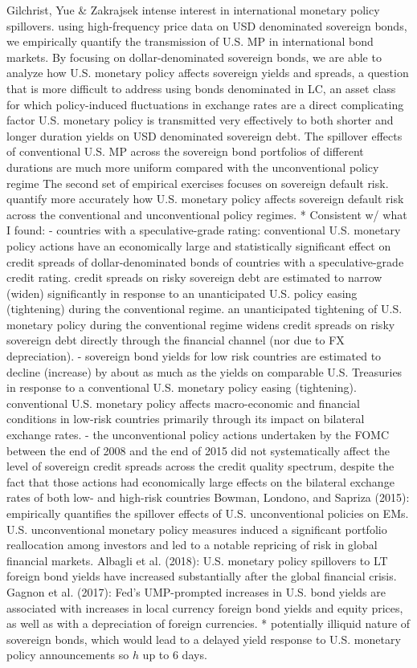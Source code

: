 Gilchrist, Yue \& Zakrajsek
intense interest in international monetary policy spillovers.
using high-frequency price data on USD denominated sovereign bonds, we empirically quantify the transmission of U.S. MP in international bond markets. By focusing on dollar-denominated sovereign bonds, we are able to analyze how U.S. monetary policy affects sovereign yields and spreads, a question that is more difficult to address using bonds denominated in LC, an asset class for which policy-induced fluctuations in exchange rates are a direct complicating factor
U.S. monetary policy is transmitted very effectively to both shorter and longer duration yields on USD denominated sovereign debt. The spillover effects of conventional U.S. MP across the sovereign bond portfolios of different durations are much more uniform compared with the unconventional policy regime
The second set of empirical exercises focuses on sovereign default risk. quantify more accurately how U.S. monetary policy affects sovereign default risk across the conventional and unconventional policy regimes.
* Consistent w/ what I found:
- countries with a speculative-grade rating: conventional U.S. monetary policy actions have an economically large and statistically significant effect on credit spreads of dollar-denominated bonds of countries with a speculative-grade credit rating. credit spreads on risky sovereign debt are estimated to narrow (widen) significantly in response to an unanticipated U.S. policy easing (tightening) during the conventional regime. an unanticipated tightening of U.S. monetary policy during the conventional regime widens credit spreads on risky sovereign debt directly through the financial channel (nor due to FX depreciation).
- sovereign bond yields for low risk countries are estimated to decline (increase) by about as much as the yields on comparable U.S. Treasuries in response to a conventional U.S. monetary policy easing (tightening). conventional U.S. monetary policy affects macro-economic and financial conditions in low-risk countries primarily through its impact on bilateral exchange rates.
- the unconventional policy actions undertaken by the FOMC between the end of 2008
and the end of 2015 did not systematically affect the level of sovereign credit spreads
across the credit quality spectrum, despite the fact that those actions had economically large effects on the bilateral exchange rates of both low- and high-risk countries
Bowman, Londono, and Sapriza (2015): empirically quantifies the spillover effects of U.S. unconventional policies on EMs. U.S. unconventional monetary policy
measures induced a significant portfolio reallocation among investors and led to a
notable repricing of risk in global financial markets.
Albagli et al. (2018): U.S. monetary policy spillovers to LT foreign bond yields have increased substantially after the global financial crisis. 
Gagnon et al. (2017): Fed's UMP-prompted increases in U.S. bond yields are associated with increases in local
currency foreign bond yields and equity prices, as well as with a depreciation of
foreign currencies.
* potentially illiquid nature of sovereign bonds, which would lead to a delayed yield response to U.S. monetary policy announcements so \(h\) up to 6 days.


